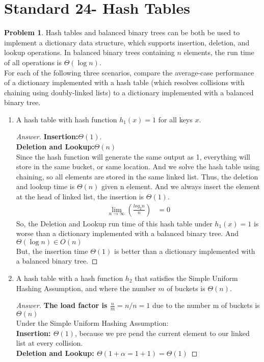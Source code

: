 \documentclass[11pt]{article}
\theoremstyle{definition}
\theoremstyle{definition}
\newtheorem{required}{Problem}
\theoremstyle{definition}
\begin{document}
\newpage
\section{Standard 24- Hash Tables}

\begin{required} \label{Hash3}
Hash tables and balanced binary trees can be both be used to implement a dictionary data structure, which supports insertion, deletion, and lookup operations. In balanced binary trees containing $n$ elements, the run time of all operations is $\Theta(\log n)$.  \\

\noindent For each of the following three scenarios, compare the average-case performance of a dictionary implemented with a hash table (which resolves collisions with chaining using doubly-linked lists) to a dictionary implemented with a balanced binary tree.
	
\begin{enumerate}[label=(\alph*)]
\item A hash table with hash function $h_1(x)=1$ for all keys $x$.

\begin{proof}[Answer]
\textbf{Insertion:}$\Theta(1)$.\\
\textbf{Deletion and Lookup:}$\Theta( n)$\\
Since the hash function will generate the same output as 1, everything will store in the same bucket, or same location. And we solve the hash table using chaining, so all elements are stored in the same linked list. Thus, the deletion and lookup time is $\Theta( n)$ given n element. And we always insert the element at the head of linked list, the insertion is $\Theta(1)$.
\begin{align*}
\lim _{n\to \infty }\left(\frac{log_2n}{n}\right)&=0
\end{align*}
So, the Deletion and Lookup run time of this hash table under  $h_1(x)=1$ is worse than a dictionary implemented with a balanced binary tree. And $\Theta(\log n) \in O(n)$\\
But, the insertion time  $\Theta(1)$ is better than a dictionary implemented with a balanced binary tree.
\end{proof}


\vskip 15pt
\item A hash table with a hash function $h_2$ that satisfies the Simple Uniform Hashing Assumption, and where the number $m$ of buckets is $\Theta(n)$.
\begin{proof}[Answer]
\textbf{The load factor is $\frac{n}{m} = n/n = 1$} due to the number m of buckets is $\Theta(n)$\\
Under the Simple Uniform Hashing Assumption:\\
\textbf{Insertion: $\Theta(1)$}, because we pre pend the current element to our linked list at every collision.\\
\textbf{Deletion and Lookup: $\Theta(1+\alpha = 1+1)=\Theta(1) $}


\end{proof}
\end{enumerate}
\end{required}
\end{document}
